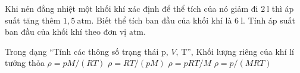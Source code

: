 \begin{ex}
Khi nén đẳng nhiệt một khối khí xác định để thể tích của nó giảm đi $2\ \mathrm{l}$ thì áp suất tăng thêm $1,5\ \mathrm{atm}$. Biết thể tích ban đầu của khối khí là $6\ \mathrm{l}$. Tính áp suất ban đầu của khối khí theo đơn vị $\mathrm{atm}$.
\end{ex}

\begin{ex}
Trong dạng “Tính các thông số trạng thái p, $V$, T”, Khối lượng riêng của khí lí tưởng thỏa
\choice
{\True $\rho=pM/(RT)$}
{$\rho=RT/(pM)$}
{$\rho=pRT/M$}
{$\rho=p/(MRT)$}
\end{ex}

